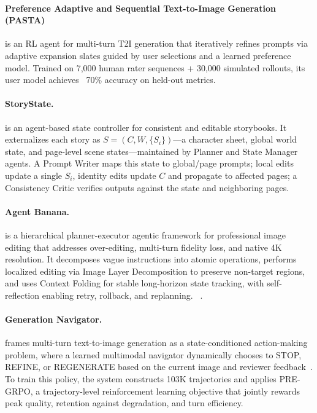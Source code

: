 \paragraph{Preference Adaptive and Sequential Text-to-Image Generation (PASTA)}
 is an RL agent for multi-turn T2I generation that iteratively refines prompts via adaptive expansion slates guided by user selections and a learned preference model. Trained on 7,000 human rater sequences + 30,000 simulated rollouts, its user model achieves ~70\% accuracy on held-out metrics.  ~\cite{nabati2025pasta}

\paragraph{StoryState.}
 is an agent-based state controller for consistent and editable storybooks. It externalizes each story as $S=(C,W,\{S_i\})$—a character sheet, global world state, and page-level scene states—maintained by Planner and State Manager agents. A Prompt Writer maps this state to global/page prompts; local edits update a single $S_i$, identity edits update $C$ and propagate to affected pages; a Consistency Critic verifies outputs against the state and neighboring pages. ~\cite{sarkar2026storystate}

\paragraph{Agent Banana.}
 is a hierarchical planner-executor agentic framework for professional image editing that addresses over-editing, multi-turn fidelity loss, and native 4K resolution. It decomposes vague instructions into atomic operations, performs localized editing via Image Layer Decomposition to preserve non-target regions, and uses Context Folding for stable long-horizon state tracking, with self-reflection enabling retry, rollback, and replanning. ~\cite{ye2026agentbanana}. 

\paragraph{Generation Navigator.}
 frames multi-turn text-to-image generation as a state-conditioned action-making problem, where a learned multimodal navigator dynamically chooses to STOP, REFINE, or REGENERATE based on the current image and reviewer feedback~\cite{avg260517969}. To train this policy, the system constructs 103K trajectories and applies PRE-GRPO, a trajectory-level reinforcement learning objective that jointly rewards peak quality, retention against degradation, and turn efficiency. 

